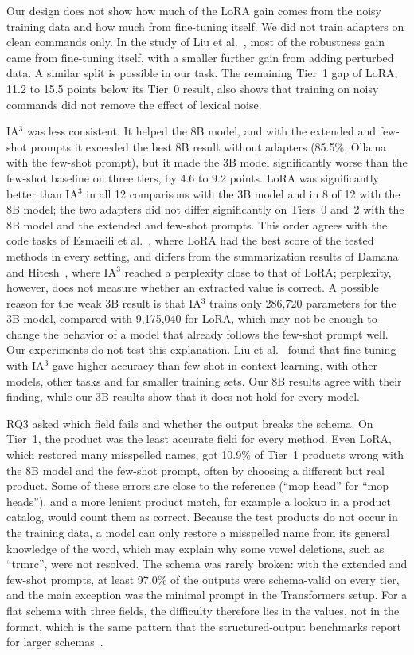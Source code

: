 \documentclass[journal,article,submit,pdftex,moreauthors]{Definitions/mdpi}
\begin{document}
Our design does not show how much of the LoRA gain comes from the noisy training data and how much from fine-tuning itself. We did not train adapters on clean commands only. In the study of Liu et al.~\citep{liu2026improving}, most of the robustness gain came from fine-tuning itself, with a smaller further gain from adding perturbed data. A similar split is possible in our task. The remaining Tier~1 gap of LoRA, 11.2 to 15.5 points below its Tier~0 result, also shows that training on noisy commands did not remove the effect of lexical noise.

IA$^3$ was less consistent. It helped the 8B model, and with the extended and few-shot prompts it exceeded the best 8B result without adapters (85.5\%, Ollama with the few-shot prompt), but it made the 3B model significantly worse than the few-shot baseline on three tiers, by 4.6 to 9.2 points. LoRA was significantly better than IA$^3$ in all 12 comparisons with the 3B model and in 8 of 12 with the 8B model; the two adapters did not differ significantly on Tiers~0 and~2 with the 8B model and the extended and few-shot prompts. This order agrees with the code tasks of Esmaeili et al.~\citep{esmaeili2026empirical}, where LoRA had the best score of the tested methods in every setting, and differs from the summarization results of Damana and Hitesh~\citep{damana2024innovative}, where IA$^3$ reached a perplexity close to that of LoRA; perplexity, however, does not measure whether an extracted value is correct. A possible reason for the weak 3B result is that IA$^3$ trains only 286,720 parameters for the 3B model, compared with 9,175,040 for LoRA, which may not be enough to change the behavior of a model that already follows the few-shot prompt well. Our experiments do not test this explanation. Liu et al.~\citep{liu2022fewshot} found that fine-tuning with IA$^3$ gave higher accuracy than few-shot in-context learning, with other models, other tasks and far smaller training sets. Our 8B results agree with their finding, while our 3B results show that it does not hold for every model.

RQ3 asked which field fails and whether the output breaks the schema. On Tier~1, the product was the least accurate field for every method. Even LoRA, which restored many misspelled names, got 10.9\% of Tier~1 products wrong with the 8B model and the few-shot prompt, often by choosing a different but real product. Some of these errors are close to the reference (``mop head'' for ``mop heads''), and a more lenient product match, for example a lookup in a product catalog, would count them as correct. Because the test products do not occur in the training data, a model can only restore a misspelled name from its general knowledge of the word, which may explain why some vowel deletions, such as ``trmrc'', were not resolved. The schema was rarely broken: with the extended and few-shot prompts, at least 97.0\% of the outputs were schema-valid on every tier, and the main exception was the minimal prompt in the Transformers setup. For a flat schema with three fields, the difficulty therefore lies in the values, not in the format, which is the same pattern that the structured-output benchmarks report for larger schemas~\citep{singh2026structured,feng2026so}.
\end{document}
